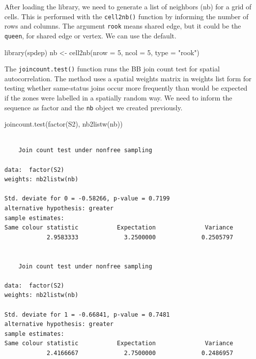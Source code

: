 \documentclass[
  letterpaper,
  DIV=11,
  numbers=noendperiod]{scrreprt}
\newenvironment{Shaded}{\begin{snugshade}}{\end{snugshade}}
\newcommand{\AttributeTok}[1]{\textcolor[rgb]{0.40,0.45,0.13}{#1}}
\newcommand{\DecValTok}[1]{\textcolor[rgb]{0.68,0.00,0.00}{#1}}
\newcommand{\FunctionTok}[1]{\textcolor[rgb]{0.28,0.35,0.67}{#1}}
\newcommand{\NormalTok}[1]{\textcolor[rgb]{0.00,0.23,0.31}{#1}}
\newcommand{\OtherTok}[1]{\textcolor[rgb]{0.00,0.23,0.31}{#1}}
\newcommand{\StringTok}[1]{\textcolor[rgb]{0.13,0.47,0.30}{#1}}
\begin{document}
After loading the library, we need to generate a list of neighbors (nb)
for a grid of cells. This is performed with the \texttt{cell2nb()}
function by informing the number of rows and columns. The argument
\texttt{rook} means shared edge, but it could be the \texttt{queen}, for
shared edge or vertex. We can use the default.

\begin{Shaded}
\begin{Highlighting}[]
\FunctionTok{library}\NormalTok{(spdep)}
\NormalTok{nb }\OtherTok{\textless{}{-}} \FunctionTok{cell2nb}\NormalTok{(}\AttributeTok{nrow =} \DecValTok{5}\NormalTok{,}
              \AttributeTok{ncol =} \DecValTok{5}\NormalTok{,}
              \AttributeTok{type =} \StringTok{"rook"}\NormalTok{)}
\end{Highlighting}
\end{Shaded}

The \texttt{joincount.test()} function runs the BB join count test for
spatial autocorrelation. The method uses a spatial weights matrix in
weights list form for testing whether same-status joins occur more
frequently than would be expected if the zones were labelled in a
spatially random way. We need to inform the sequence as factor and the
\texttt{nb} object we created previously.

\begin{Shaded}
\begin{Highlighting}[]
\FunctionTok{joincount.test}\NormalTok{(}\FunctionTok{factor}\NormalTok{(S2), }
                \FunctionTok{nb2listw}\NormalTok{(nb))}
\end{Highlighting}
\end{Shaded}

\begin{verbatim}

    Join count test under nonfree sampling

data:  factor(S2) 
weights: nb2listw(nb) 

Std. deviate for 0 = -0.58266, p-value = 0.7199
alternative hypothesis: greater
sample estimates:
Same colour statistic           Expectation              Variance 
            2.9583333             3.2500000             0.2505797 


    Join count test under nonfree sampling

data:  factor(S2) 
weights: nb2listw(nb) 

Std. deviate for 1 = -0.66841, p-value = 0.7481
alternative hypothesis: greater
sample estimates:
Same colour statistic           Expectation              Variance 
            2.4166667             2.7500000             0.2486957 
\end{verbatim}
\end{document}

